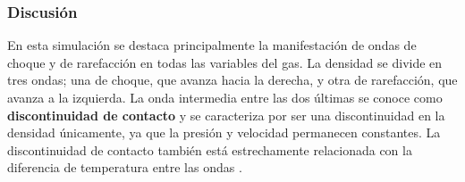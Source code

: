 \subsubsection{Discusión}
En esta simulación se destaca principalmente la manifestación de ondas de choque y de rarefacción en todas las variables del gas. La densidad se divide en tres ondas; una de choque, que avanza hacia la derecha, y otra de rarefacción, que avanza a la izquierda. La onda intermedia entre las dos últimas se conoce como \textbf{discontinuidad de contacto} \cite{thesis-euler-godunov} y se caracteriza por ser una discontinuidad en la densidad únicamente, ya que la presión y velocidad permanecen constantes. La discontinuidad de contacto también está estrechamente relacionada con la diferencia de temperatura entre las ondas \cite{LeVeque}.